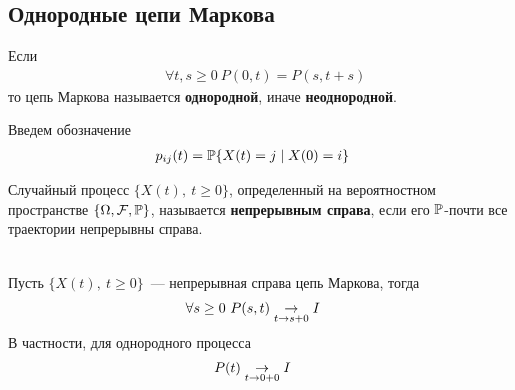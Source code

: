 \subsection{Однородные цепи Маркова}
\begin{Def}
    Если
    \begin{align*}
      & \forall t, s \geq 0 \ P(0,t) = P(s, t+s)
    \end{align*}
    то цепь Маркова называется \textbf{однородной}, иначе \textbf{неоднородной}.
\end{Def}
\begin{Des}
    Введем обозначение
    \begin{align*}
      & p_{ij}(t) = \mathbb{P}\{X(t) = j\mid X(0) = i\}
    \end{align*}
\end{Des}
\begin{Def}
    Случайный процесс $\{X(t), \ t \geq 0\}$, определенный на вероятностном
    пространстве $\{\Omega, \mathcal{F}, \mathbb{P}\}$, называется \textbf{непрерывным справа},
    если его $\mathbb{P}$-почти все траектории непрерывны справа.
\end{Def}
\begin{theorem}~
    \\
    Пусть $\{X(t), \ t \geq 0\}$~--- непрерывная справа цепь Маркова, тогда
    \begin{align*}
      & \forall s \geq 0 \ P(s,t) \underset{t \to s+0}\rightarrow I
    \end{align*}
    В частности, для однородного процесса
    \begin{align*}
      & P(t) \underset{t \to 0+0}\rightarrow I
    \end{align*}
\end{theorem}
